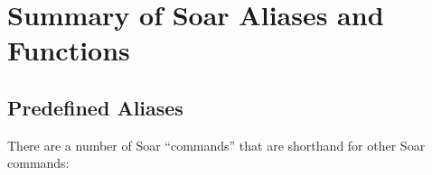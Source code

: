 \markboth{}{}
\section*{Summary of Soar Aliases and Functions}
\label{FUNCTIONS}
\label{func-sum}

\subsection*{Predefined Aliases}\vspace{-5pt}
\label{predefined-aliases}

There are a number of Soar ``commands'' that are shorthand for other Soar
commands: 


